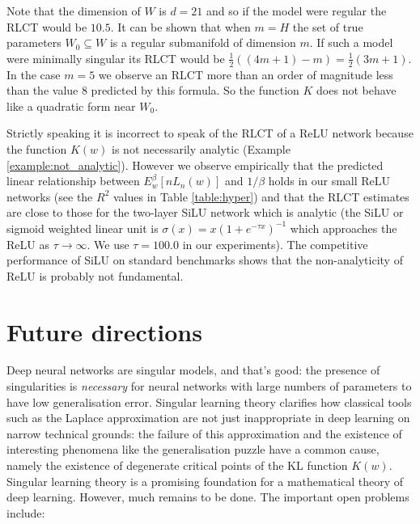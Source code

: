 \documentclass{article} %
\begin{document}
Note that the dimension of $W$ is $d = 21$ and so if the model were regular the RLCT would be $10.5$. It can be shown that when $m = H$ the set of true parameters $W_0 \subseteq W$ is a regular submanifold of dimension $m$. If such a model were minimally singular its RLCT would be $\tfrac{1}{2}( (4m + 1) - m ) = \tfrac{1}{2}( 3m + 1 )$. In the case $m = 5$ we observe an RLCT more than an order of magnitude less than the value $8$ predicted by this formula. So the function $K$ does not behave like a quadratic form near $W_0$.

Strictly speaking it is incorrect to speak of the RLCT of a ReLU network because the function $K(w)$ is not necessarily analytic (Example \ref{example:not_analytic}). However we observe empirically that the predicted linear relationship between $E^\beta_w[nL_n(w)]$ and $1/\beta$ holds in our small ReLU networks (see the $R^2$ values in Table \ref{table:hyper}) and that the RLCT estimates are close to those for the two-layer SiLU network \citep{hendrycks2016gaussian} which is analytic (the SiLU or sigmoid weighted linear unit is $\sigma(x) = x (1 + e^{-\tau x})^{-1}$ which approaches the ReLU as $\tau \to \infty$. We use $\tau = 100.0$ in our experiments). The competitive performance of SiLU on standard benchmarks \citep{ramachandran2017swish} shows that the non-analyticity of ReLU is probably not fundamental.


\section{Future directions}

Deep neural networks are singular models, and that's good: the presence of singularities is \emph{necessary} for neural networks with large numbers of parameters to have low generalisation error. Singular learning theory clarifies how classical tools such as the Laplace approximation are not just inappropriate in deep learning on narrow technical grounds: the failure of this approximation and the existence of interesting phenomena like the generalisation puzzle have a common cause, namely the existence of degenerate critical points of the KL function $K(w)$. 
Singular learning theory is a promising foundation for a mathematical theory of deep learning. However, much remains to be done. The important open problems include:
\end{document}
